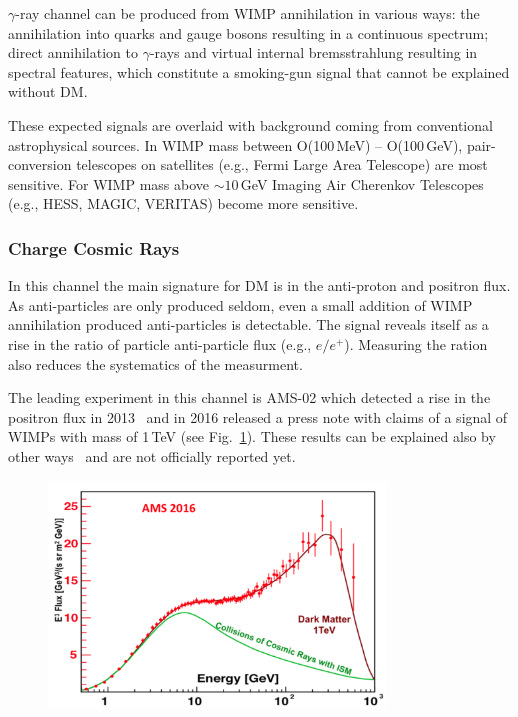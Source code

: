 $\gamma$-ray channel can be produced from WIMP annihilation in various ways: the annihilation into quarks and gauge bosons resulting in a continuous spectrum; direct annihilation to $\gamma$-rays and virtual internal bremsstrahlung resulting in spectral features, which constitute a smoking-gun signal that cannot be explained without DM.

These expected signals are overlaid with background coming from conventional astrophysical sources. In WIMP mass between O(100\,MeV) -- O(100\,GeV), pair-conversion telescopes on satellites (e.g., Fermi Large Area Telescope) are most sensitive. For WIMP mass above $\sim 10$\,GeV Imaging Air Cherenkov Telescopes (e.g., HESS, MAGIC, VERITAS) become more sensitive.

\subsubsection{Charge Cosmic Rays}

In this channel the main signature for DM is in the anti-proton and positron flux. As anti-particles are  only produced seldom, even a small addition of WIMP annihilation produced anti-particles is detectable. The signal reveals itself as a rise in the ratio of particle anti-particle flux (e.g., $e/e^+$). Measuring the ration also reduces the systematics of the measurment.  

The leading experiment in this channel is AMS-02 which detected a rise in the positron flux in 2013~\cite{Aguilar:2013qda} and in 2016 released a press note with claims of a signal of WIMPs with mass of 1\,TeV (see Fig.~\ref{fig:AMS}). These results can be explained also by other ways~\cite{Blum:2013zsa} and are not officially reported yet. 

\begin{figure}[]
	\centering
	\includegraphics[width=0.8\textwidth]{figs/AMS02.png}
	\label{fig:AMS}
\end{figure}  


